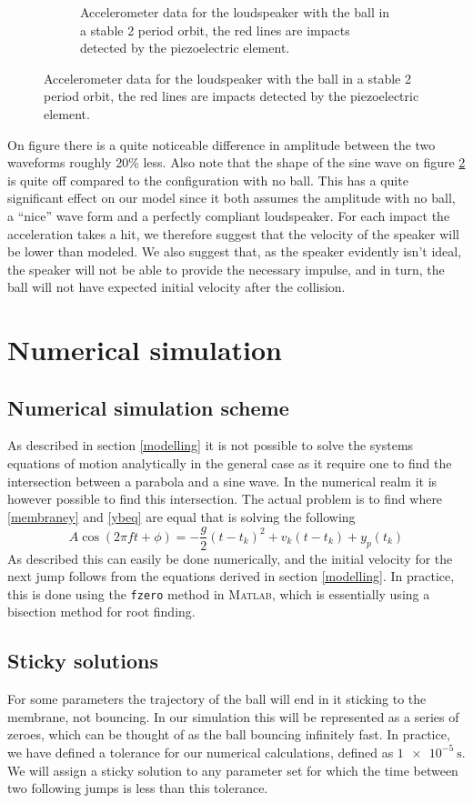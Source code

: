 \documentclass[12pt,oneside,a4paper]{article}
\numberwithin{equation}{section}
\begin{document}
{{{{\begin{figure}[h]
\begin{subfigure}[t]{0.49\textwidth}
	\caption{Accelerometer data for the loudspeaker with the ball in a stable 2 period orbit, the red lines are impacts detected by the piezoelectric element.}
	\label{wball}
\end{subfigure}
\end{figure}
On figure there is a quite noticeable difference in amplitude between the two 
waveforms roughly 20\% less. Also note that the shape of the sine wave on 
figure \ref{wball} is quite off compared to the configuration with no ball. 
This has a quite significant effect on our model since it both assumes the 
amplitude with no ball, a ``nice'' wave form and a perfectly compliant 
loudspeaker. For each impact the acceleration takes a hit, we therefore suggest 
that the velocity of the speaker will be lower than modeled. We also suggest 
that, as the speaker evidently isn't ideal, the speaker will not be able to 
provide the necessary impulse, and in turn, the ball will not have expected 
initial velocity after the collision.
 
\section{Numerical simulation}
\label{Numericalsec}
\subsection{Numerical simulation scheme}
As described in section \ref{modelling} it is not possible to solve the systems 
equations of motion analytically in the general case as it require one to find 
the intersection between a parabola and a sine wave. In the numerical realm it 
is however possible to find this intersection. The actual problem is to find 
where \eqref{membraney} and \eqref{ybeq} are equal that is solving the following
\begin{equation}
	A \cos(2\pi f t+ \phi) = -\frac{g}{2}(t-t_k)^2+v_k(t-t_k)+y_p(t_k)
\end{equation}
As described this can easily be done numerically, and the initial velocity for the next jump follows from the equations derived in section \ref{modelling}. In practice, this is done using the \texttt{fzero} method in \textsc{Matlab}, which is essentially using a bisection method for root finding.

\subsection{Sticky solutions}
For some parameters the trajectory of the ball will end in it sticking to the 
membrane, not bouncing. In our simulation this will be represented as a series 
of zeroes, which can be thought of as the ball bouncing infinitely fast. In 
practice, we have defined a tolerance for our numerical calculations, defined 
as $\SI{1e-5}{\second}$. We will assign a sticky solution to any parameter set 
for which the time between two following jumps is less than this tolerance. 
}}}}
\end{document}
